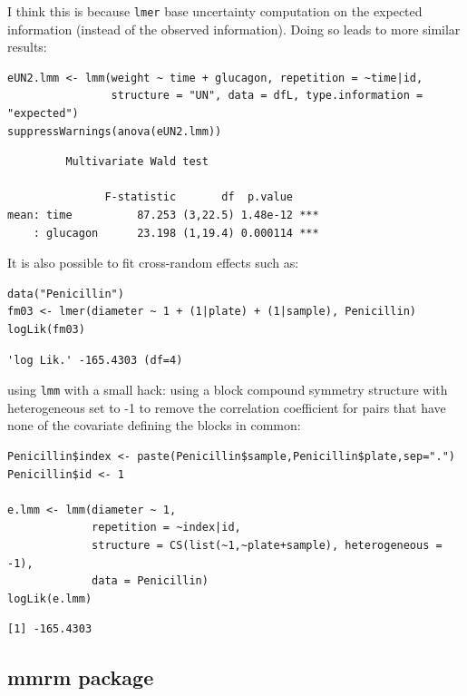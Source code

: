 \documentclass[12pt]{article}
\begin{document}
I think this is because \texttt{lmer} base uncertainty computation on the
expected information (instead of the observed information). Doing so
leads to more similar results:
\lstset{language=r,label= ,caption= ,captionpos=b,numbers=none}
\begin{lstlisting}
eUN2.lmm <- lmm(weight ~ time + glucagon, repetition = ~time|id,
                structure = "UN", data = dfL, type.information = "expected")
suppressWarnings(anova(eUN2.lmm))
\end{lstlisting}

\begin{verbatim}
	     Multivariate Wald test 

               F-statistic       df  p.value    
mean: time          87.253 (3,22.5) 1.48e-12 ***
    : glucagon      23.198 (1,19.4) 0.000114 ***
\end{verbatim}


It is also possible to fit cross-random effects such as:
\lstset{language=r,label= ,caption= ,captionpos=b,numbers=none}
\begin{lstlisting}
data("Penicillin")
fm03 <- lmer(diameter ~ 1 + (1|plate) + (1|sample), Penicillin)
logLik(fm03)
\end{lstlisting}

\begin{verbatim}
'log Lik.' -165.4303 (df=4)
\end{verbatim}


using \texttt{lmm} with a small hack: using a block compound symmetry
structure with heterogeneous set to -1 to remove the correlation
coefficient for pairs that have none of the covariate defining the
blocks in common:
\lstset{language=r,label= ,caption= ,captionpos=b,numbers=none}
\begin{lstlisting}
Penicillin$index <- paste(Penicillin$sample,Penicillin$plate,sep=".")
Penicillin$id <- 1

e.lmm <- lmm(diameter ~ 1,
             repetition = ~index|id,
             structure = CS(list(~1,~plate+sample), heterogeneous = -1),
             data = Penicillin)
logLik(e.lmm)
\end{lstlisting}

\begin{verbatim}
[1] -165.4303
\end{verbatim}

\subsection{mmrm package}
\label{sec:orgde7ab92}
\end{document}
